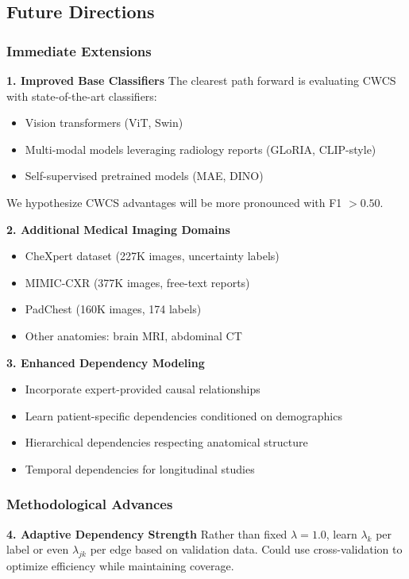\subsection{Future Directions}

\subsubsection{Immediate Extensions}

\textbf{1. Improved Base Classifiers}
The clearest path forward is evaluating CWCS with state-of-the-art classifiers:
\begin{itemize}
    \item Vision transformers (ViT, Swin)
    \item Multi-modal models leveraging radiology reports (GLoRIA, CLIP-style)
    \item Self-supervised pretrained models (MAE, DINO)
\end{itemize}
We hypothesize CWCS advantages will be more pronounced with F1 $>0.50$.

\textbf{2. Additional Medical Imaging Domains}
\begin{itemize}
    \item CheXpert dataset (227K images, uncertainty labels)
    \item MIMIC-CXR (377K images, free-text reports)
    \item PadChest (160K images, 174 labels)
    \item Other anatomies: brain MRI, abdominal CT
\end{itemize}

\textbf{3. Enhanced Dependency Modeling}
\begin{itemize}
    \item Incorporate expert-provided causal relationships
    \item Learn patient-specific dependencies conditioned on demographics
    \item Hierarchical dependencies respecting anatomical structure
    \item Temporal dependencies for longitudinal studies
\end{itemize}

\subsubsection{Methodological Advances}

\textbf{4. Adaptive Dependency Strength}
Rather than fixed $\lambda=1.0$, learn $\lambda_k$ per label or even $\lambda_{jk}$ per edge based on validation data. Could use cross-validation to optimize efficiency while maintaining coverage.


